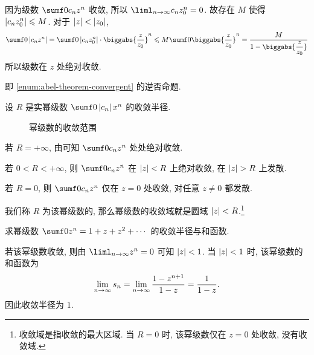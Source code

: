 \begin{proofenuma}
  \item 因为级数 $\sumf0 c_nz^n$ 收敛, 所以 $\liml_{n\ra\infty}c_n z_0^n=0$.
  故存在 $M$ 使得 $\left|c_nz_0^n\right|\leqslant M$.
  对于 $\left|z\right|<\left|z_0\right|$,
  \[
      \sumf0 \abs{c_nz^n}
    =\sumf0 \abs{c_nz_0^n}\cdot\biggabs{\frac z{z_0}}^n
    \le M\sumf0 \biggabs{\frac z{z_0}}^n
    =\frac{M}{1-\biggabs{\dfrac z{z_0}}}
  \]
  所以级数在 $z$ 处绝对收敛.
  \item 即 \ref{enum:abel-theorem-convergent} 的逆否命题.\qedhere
\end{proofenuma}

设 $R$ 是实幂级数 $\sumf0 \abs{c_n}x^n$ 的收敛半径.
\begin{figure}[H]
  \centering
  \caption{幂级数的收敛范围}
\end{figure}
\begin{enuma}
  \item 若 $R=+\infty$, 由\thmAF 可知 $\sumf0 c_nz^n$ 处处绝对收敛.
  \item 若 $0<R<+\infty$, 则 $\sumf0 c_nz^n$ 在 $\left|z\right|<R$ 上绝对收敛, 在 $\abs{z}>R$ 上发散.
  \item 若 $R=0$, 则 $\sumf0 c_nz^n$ 仅在 $z=0$ 处收敛, 对任意 $z\neq 0$ 都发散.
\end{enuma}
我们称 $R$ 为该幂级数的, 那么\alert{幂级数的收敛域就是圆域 $\left|z\right|<R$}.\footnote{收敛域是指收敛的最大区域. 当 $R=0$ 时, 该幂级数仅在 $z=0$ 处收敛, 没有收敛域.}

\begin{example}
  求幂级数 $\sumf0 z^n=1+z+z^2+\cdots$ 的收敛半径与和函数.
\end{example}

\begin{solution}
  若该幂级数收敛, 则由 $\liml_{n\ra\infty}z^n=0$ 可知 $\left|z\right|<1$.
  当 $\left|z\right|<1$ 时, 该幂级数的和函数为
  \[
     \lim_{n\rightarrow\infty}s_n
    =\lim_{n\rightarrow\infty}\frac{1-z^{n+1}}{1-z}
    =\frac1{1-z}.
  \]
  因此收敛半径为 $1$.
\end{solution}

